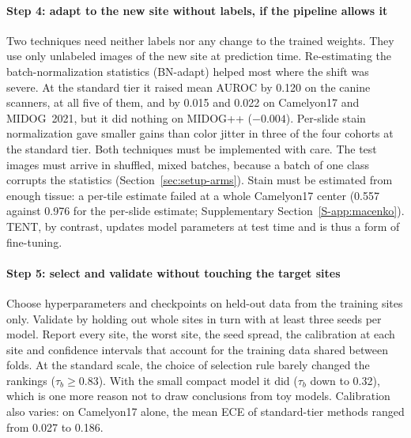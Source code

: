 \paragraph{Step 4: adapt to the new site without labels, if the pipeline
allows it} Two techniques need neither labels nor any change to the trained
weights. They use only unlabeled images of the new site at prediction time.
Re-estimating the batch-normalization statistics (BN-adapt) helped most where
the shift was severe. At the standard tier it raised mean AUROC by 0.120 on the
canine scanners, at all five of them, and by 0.015 and 0.022 on Camelyon17 and
MIDOG~2021, but it did nothing on MIDOG++ ($-0.004$). Per-slide stain
normalization gave smaller gains than color jitter in three of the four
cohorts at the standard tier. Both
techniques must be implemented with care. The test images must arrive in
shuffled, mixed batches, because a batch of one class corrupts the statistics
(Section~\ref{sec:setup-arms}). Stain must be estimated from enough tissue: a
per-tile estimate failed at a whole Camelyon17 center (0.557 against 0.976 for
the per-slide estimate; Supplementary Section~\ref{S-app:macenko}). TENT, by contrast,
updates model parameters at test time and is thus a form of fine-tuning.

\paragraph{Step 5: select and validate without touching the target sites}
Choose hyperparameters and checkpoints on held-out data from the training
sites only. Validate by holding out whole sites in turn with at least three
seeds per model. Report every site, the worst site, the seed spread, the
calibration at each site and confidence intervals that account for the
training data shared between folds. At the standard scale, the choice of
selection rule barely changed the rankings ($\tau_b\ge0.83$). With the small
compact model it did ($\tau_b$ down to 0.32), which is one more reason not to
draw conclusions from toy models. Calibration also varies: on Camelyon17 alone,
the mean ECE of standard-tier methods ranged from 0.027 to 0.186.

